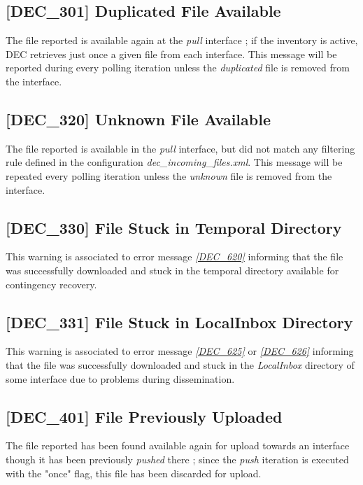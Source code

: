 \documentclass[dec_sum_main.tex]{subfiles}
\begin{document}
\subsection{[DEC\_301] Duplicated File Available}
The file reported is available again at the \textit{pull} interface ; if the inventory is active, DEC retrieves just once a given file from each interface. This message will be reported during every polling iteration unless the \textit{duplicated} file is removed from the interface.

\subsection{[DEC\_320] Unknown File Available}
The file reported is available in the \textit{pull} interface, but did not match any filtering rule defined in the configuration \textit{dec\_incoming\_files.xml}. This message will be repeated every polling iteration unless the \textit{unknown} file is removed from the interface.

\subsection{[DEC\_330] File Stuck in Temporal Directory}
This warning is associated to error message \hyperref[DEC620]{\textit{[DEC\_620]}} informing that the file was successfully downloaded and stuck in the temporal directory available for contingency recovery.

\subsection{[DEC\_331] File Stuck in LocalInbox Directory}
This warning is associated to error message \hyperref[DEC625]{\textit{[DEC\_625]}} or \hyperref[DEC626]{\textit{[DEC\_626]}} informing that the file was successfully downloaded and stuck in the \textit{LocalInbox} directory of some interface due to problems during dissemination.

\label{DEC401}
\subsection{[DEC\_401] File Previously Uploaded}
The file reported has been found available again for upload towards an interface though it has been previously \textit{pushed} there ; since the \textit{push} iteration is executed with the "once" flag, this file has been discarded for upload.

\end{document}
